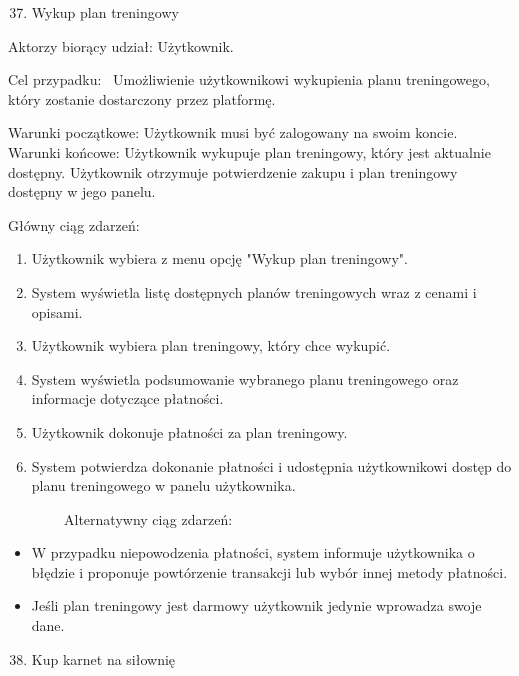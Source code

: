 {\hfill\break
}

\begin{enumerate}
\setcounter{enumi}{36}
\tightlist
\item
  {Wykup plan treningowy}
\end{enumerate}

{Aktorzy biorący udział: Użytkownik.}

{Cel przypadku: ~Umożliwienie użytkownikowi wykupienia planu
treningowego, który zostanie dostarczony przez platformę.}

{Warunki początkowe: Użytkownik musi być zalogowany na swoim koncie.\\
Warunki końcowe: Użytkownik wykupuje plan treningowy, który jest
aktualnie dostępny. Użytkownik otrzymuje potwierdzenie zakupu i plan
treningowy dostępny w jego panelu.}

{Główny ciąg zdarzeń:}

\begin{enumerate}
\tightlist
\item
  {Użytkownik wybiera z menu opcję "Wykup plan treningowy".}
\item
  {System wyświetla listę dostępnych planów treningowych wraz z cenami i
  opisami.}
\item
  {Użytkownik wybiera plan treningowy, który chce wykupić.}
\item
  {System wyświetla podsumowanie wybranego planu treningowego oraz
  informacje dotyczące płatności.}
\item
  {Użytkownik dokonuje płatności za plan treningowy.}
\item
  {System potwierdza dokonanie płatności i udostępnia użytkownikowi
  dostęp do planu treningowego w panelu użytkownika.}
\end{enumerate}

{~~~~~~~~Alternatywny ciąg zdarzeń:}

\begin{itemize}
\tightlist
\item
  {W przypadku niepowodzenia płatności, system informuje użytkownika o
  błędzie i proponuje powtórzenie transakcji lub wybór innej metody
  płatności.}
\item
  {Jeśli plan treningowy jest darmowy użytkownik jedynie wprowadza swoje
  dane.\\
  }
\end{itemize}

{}

\begin{enumerate}
\setcounter{enumi}{37}
\tightlist
\item
  {Kup karnet na siłownię}
\end{enumerate}

